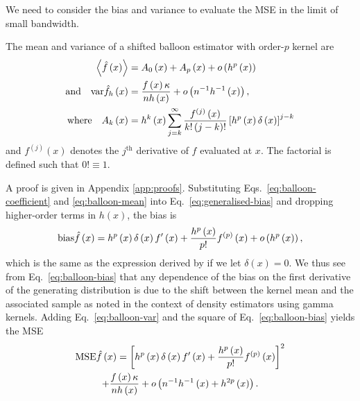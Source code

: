 We need to consider the bias and variance to evaluate the MSE in the limit of small bandwidth.
\begin{thm}
\label{thm:balloon-moments} The mean and variance of a shifted balloon estimator with order-$p$ kernel are 
\begin{align}
\left\langle \hat{f}\left(x\right)\right\rangle  & =A_{0}\left(x\right)+A_{p}\left(x\right)+o\left(h^{p}\left(x\right)\right)\label{eq:balloon-mean}\\
\text{and}\quad\var\hat{f}_{h}\left(x\right) & =\frac{f\left(x\right)\kappa}{nh\left(x\right)}+o\left(n^{-1}h^{-1}\left(x\right)\right),\label{eq:balloon-var}\\
\text{where}\quad A_{k}\left(x\right) & =h^{k}\left(x\right)\sum_{j=k}^{\infty}\frac{f^{\left(j\right)}\left(x\right)}{k!\left(j-k\right)!}\left[h^{p}\left(x\right)\delta\left(x\right)\right]^{j-k}\label{eq:balloon-coefficient}
\end{align}
and $f^{(j)}(x)$ denotes the $j^{\text{th}}$ derivative of $f$ evaluated at $x$. The factorial is defined such that $0!\equiv1$.
\end{thm}
A proof is given in Appendix \ref{app:proofs}. Substituting Eqs.~\eqref{eq:balloon-coefficient} and \eqref{eq:balloon-mean} into Eq.~\eqref{eq:generalised-bias} and dropping higher-order terms in $h\left(x\right)$, the bias is 
\begin{equation}
\bias\hat{f}\left(x\right)=h^{p}\left(x\right)\delta\left(x\right)f'\left(x\right)+\frac{h^{p}\left(x\right)}{p!}f^{\left(p\right)}\left(x\right)+o\left(h^{p}\left(x\right)\right),\label{eq:balloon-bias}
\end{equation}
which is the same as the expression derived by \citet{Terrell1992} if we let $\delta\left(x\right)=0$. We thus see from Eq.~\eqref{eq:balloon-bias} that any dependence of the bias on the first derivative of the generating distribution is due to the shift between the kernel mean and the associated sample as \citet{Chen2000} noted in the context of density estimators using gamma kernels. Adding Eq.~\eqref{eq:balloon-var} and the square of Eq.~\eqref{eq:balloon-bias} yields the MSE
\begin{multline*}
\mse\hat{f}\left(x\right)=\left[h^{p}\left(x\right)\delta\left(x\right)f'\left(x\right)+\frac{h^{p}\left(x\right)}{p!}f^{\left(p\right)}\left(x\right)\right]^{2}\\
+\frac{f\left(x\right)\kappa}{nh\left(x\right)}+o\left(n^{-1}h^{-1}\left(x\right)+h^{2p}\left(x\right)\right).
\end{multline*}



